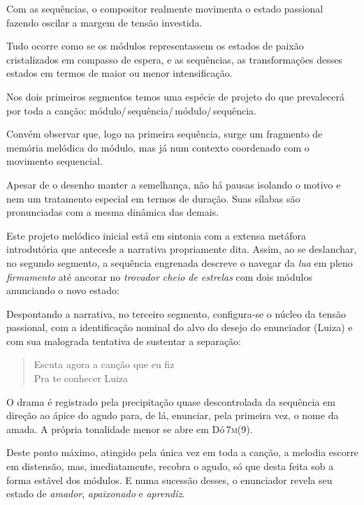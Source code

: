 Com as sequências, o compositor realmente movimenta o estado passional
fazendo oscilar a margem de tensão investida.

Tudo ocorre como se os módulos representassem os estados de paixão
cristalizados em compasso de espera, e as sequências, as transformações
desses estados em termos de maior ou menor intensificação.

Nos dois primeiros segmentos temos uma espécie de projeto do que
prevalecerá por toda a canção: módulo/\,sequência/\,módulo/\,sequência.



Convém observar que, logo na primeira sequência, surge um fragmento de
memória melódica do módulo, mas já num contexto coordenado com o
movimento sequencial.


Apesar de o desenho manter a semelhança, não há pausas isolando o motivo
e nem um tratamento especial em termos de duração. Suas sílabas são
pronunciadas com a mesma dinâmica das demais.

Este projeto melódico inicial está em sintonia com a extensa metáfora
introdutória que antecede a narrativa propriamente dita. Assim, ao se
deslanchar, no segundo segmento, a sequência engrenada descreve o
navegar da \textit{lua} em pleno \textit{firmamento} até ancorar no \textit{trovador
cheio de estrelas} com dois módulos anunciando o novo estado:


Despontando a narrativa, no terceiro segmento, configura-se o núcleo da
tensão passional, com a identificação nominal do alvo do desejo do
enunciador (Luiza) e com sua malograda tentativa de sustentar a
separação:

\begin{verse}
Escuta agora a canção que eu fiz\\
Pra te conhecer Luiza
\end{verse}

O drama é registrado pela precipitação quase descontrolada da sequência
em direção ao ápice do agudo para, de lá, enunciar, pela primeira vez, o
nome da amada. A própria tonalidade menor se abre em Dó\,\textsc{7m(9)}.


Deste ponto máximo, atingido pela única vez em toda a canção, a melodia
escorre em distensão, mas, imediatamente, recobra o agudo, só que desta
feita sob a forma estável dos módulos. E numa sucessão desses, o
enunciador revela seu estado de \textit{amador}, \textit{apaixonado} e
\textit{aprendiz}.

